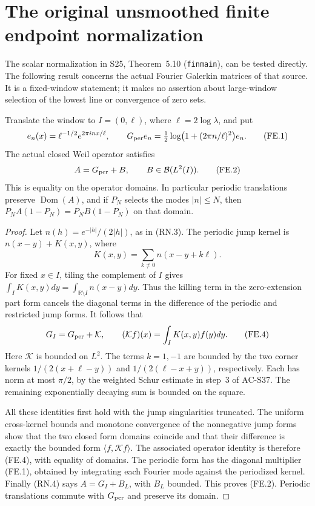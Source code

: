 \section{The original unsmoothed finite endpoint normalization}
\label{sec:spectral-finite-endpoint}

The scalar normalization in S25, Theorem~5.10
(\texttt{finmain}), can be tested directly.  The following result
concerns the actual Fourier Galerkin matrices of that source.
It is a fixed-window statement; it makes no assertion about
large-window selection of the lowest line or convergence of zero sets.

\begin{lemma}
\label{AC-S40-periodic}
Translate the window to \(I=(0,\ell)\), where
\(\ell=2\log\lambda\), and put
\[
 e_n(x)=\ell^{-1/2}e^{2\pi inx/\ell},\qquad
 G_{\rm per}e_n=\tfrac12\log\bigl(1+(2\pi n/\ell)^2\bigr)e_n.
                                                        \tag{FE.1}
\]
The actual closed Weil operator satisfies
\[
                         A=G_{\rm per}+B,
                  \qquad B\in\mathcal B(L^2(I)).          \tag{FE.2}
\]
This is equality on the operator domains.  In particular periodic
translations preserve \(\operatorname{Dom}(A)\), and if \(P_N\)
selects the modes \(|n|\leq N\), then
\(P_NA(1-P_N)=P_NB(1-P_N)\) on that domain.
\end{lemma}
\begin{proof}
Let \(n(h)=e^{-|h|}/(2|h|)\), as in (RN.3).
The periodic jump kernel is
\(n(x-y)+K(x,y)\), where
\[
                     K(x,y)=\sum_{k\ne0}n(x-y+k\ell).
                                                        \tag{FE.3}
\]
For fixed \(x\in I\), tiling the complement of \(I\) gives
\(\int_I K(x,y)dy=\int_{\mathbb R\setminus I}n(x-y)dy\).
Thus the killing term in the zero-extension part form cancels
the diagonal terms in the difference of the periodic and restricted
jump forms.  It follows that
\[
                     G_I=G_{\rm per}+\mathcal K,
             \qquad (\mathcal Kf)(x)=\int_I K(x,y)f(y)dy.
                                                        \tag{FE.4}
\]
Here \(\mathcal K\) is bounded on \(L^2\).  The terms \(k=1,-1\)
are bounded by the two corner kernels
\(1/(2(x+\ell-y))\) and \(1/(2(\ell-x+y))\), respectively.
Each has norm at most \(\pi/2\), by the weighted Schur estimate
in step~3 of AC-S37.  The remaining exponentially decaying sum
is bounded on the square.

All these identities first hold with the jump singularities
truncated.  The uniform cross-kernel bounds and monotone convergence
of the nonnegative jump forms show that the two closed form domains
coincide and that their difference is exactly the bounded form
\(\langle f,\mathcal Kf\rangle\).  The associated operator identity
is therefore (FE.4), with equality of domains.
The periodic form has the diagonal multiplier (FE.1), obtained by
integrating each Fourier mode against the periodized kernel.
Finally (RN.4) says \(A=G_I+B_L\), with \(B_L\) bounded.
This proves (FE.2).  Periodic translations commute with
\(G_{\rm per}\) and preserve its domain.
\end{proof}

